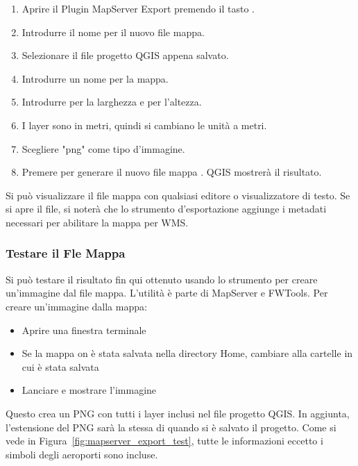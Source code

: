 \begin{enumerate}
  \item Aprire il Plugin MapServer Export premendo il tasto
  .
  \item Introdurre il nome  per il nuovo file mappa.
  \item Selezionare il file progetto QGIS  appena salvato.
  \item Introdurre un nome  per la mappa.
  \item Introdurre  per la larghezza e  per l'altezza.
  \item I layer sono in metri, quindi si cambiano le unità a metri.
  \item Scegliere "png" come tipo d'immagine.
  \item Premere  per generare il nuovo file mappa . 
  QGIS mostrerà il risultato.
\end{enumerate}

Si può visualizzare il file mappa con qualsiasi editore o visualizzatore di testo. Se si apre il file, si noterà che lo strumento d'esportazione aggiunge i metadati necessari per abilitare la mappa per WMS. 

\subsubsection{Testare il Fle Mappa}

Si può testare il risultato fin qui ottenuto usando lo strumento  per creare un'immagine dal file mappa. L'utilità  è parte di MapServer e FWTools. 
Per creare un'immagine dalla mappa:

\begin{itemize}
\item Aprire una finestra terminale
\item Se la mappa on è stata salvata nella directory Home, cambiare alla cartelle in cui è stata salvata
\item Lanciare  e mostrare l'immagine 
\end{itemize}
 
Questo crea un PNG con tutti i layer inclusi nel file progetto QGIS. 
In aggiunta, l'estensione del PNG sarà la stessa di quando si è salvato il progetto. Come si vede in Figura~\ref{fig:mapserver_export_test}, tutte le informazioni eccetto i simboli degli aeroporti sono incluse.

